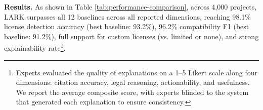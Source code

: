 \begin{table}[ht!]
\centering
\caption{Performance Comparison with Existing Tools (with Statistical Significance)}
\label{tab:performance-comparison}
\end{table}


\noindent\textbf{Results.} As shown in Table \ref{tab:performance-comparison}, across 4,000 projects, LARK surpasses all 12 baselines across all reported dimensions, reaching 98.1\% license detection accuracy (best baseline: 93.2\%), 96.2\% compatibility F1 (best baseline: 91.2\%), full support for custom licenses (vs. limited or none), and strong explainability rate\footnote{Experts evaluated the quality of explanations on a 1–5 Likert scale along four dimensions: citation accuracy, legal reasoning, actionability, and usefulness. We report the average composite score, with experts blinded to the system that generated each explanation to ensure consistency.}.

